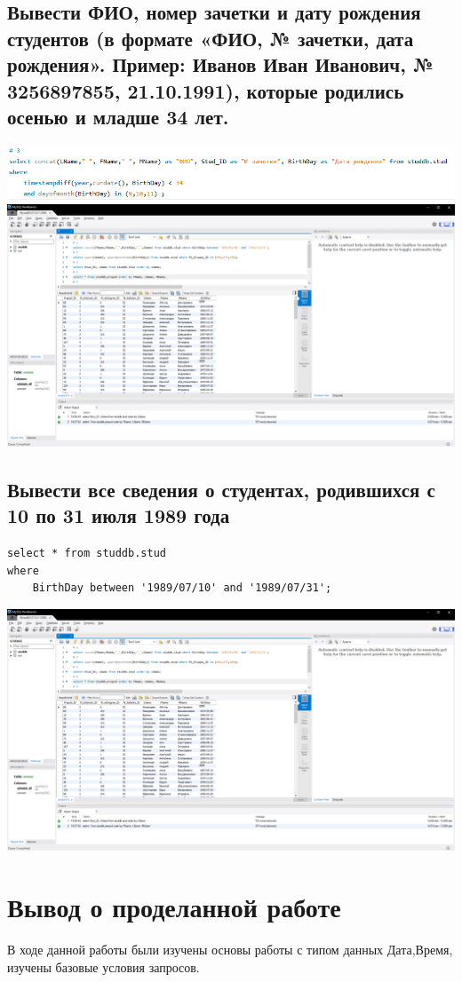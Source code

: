 \documentclass[a4paper, 12pt]{article}
\begin{document}
\subsection{Вывести ФИО,  номер зачетки и дату рождения студентов (в формате «ФИО, № зачетки, дата рождения». Пример: Иванов Иван Иванович,  № 3256897855,  21.10.1991), которые родились осенью и младше 34 лет.}
\includegraphics{5-3-1.png}\\
\includegraphics[width=\textwidth]{5-3.png}

\subsection{Вывести все сведения о студентах, родившихся с 10 по 31 июля 1989 года}
\begin{lstlisting}
select * from studdb.stud
where
	BirthDay between '1989/07/10' and '1989/07/31';
\end{lstlisting}
\includegraphics[width=\textwidth]{5-4.png}

\newpage
\section{Вывод о проделанной работе}
В ходе данной работы были изучены основы работы с типом данных Дата,Время, изучены базовые условия запросов. 
\end{document}
